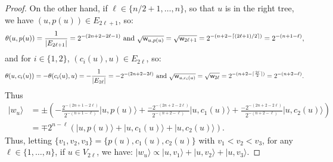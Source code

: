 \documentclass{article}
\def\ket#1{{\lvert}#1\rangle}
\renewcommand{\>}{\rangle}
\newcommand{\<}{\langle}
\renewcommand{\(}{\left(}
\renewcommand{\)}{\right)}
\def\w{{\sf w}}
\begin{document}
\begin{proof}
\noindent On the other hand, if $\ell\in \{n/2+1,\dots, n\}$, so that $u$ is in the right tree, we have $(u,p(u))\in E_{2\ell+1}$, so:
$$\theta(u,p(u)) = \frac{1}{|E_{2\ell+1}|} = 2^{-(2n+2-2\ell-1)}
\mbox{ and }
\sqrt{\w_{u,p(u)}}=\sqrt{\w_{2\ell+1}}=2^{-(n+2-\lceil (2\ell+1)/2\rceil)} = 2^{-(n+1-\ell)},
$$
and for $i\in\{1,2\}$, $(c_i(u),u)\in E_{2\ell}$, so:
$$\theta(u,c_i(u)) = -\theta(c_i(u),u)=-\frac{1}{|E_{2\ell}|} = -2^{-(2n+2-2\ell)}
\mbox{ and }
\sqrt{\w_{u,c_i(u)}}=\sqrt{\w_{2\ell}}=2^{-(n+2-\lceil \frac{2\ell}{2}\rceil)} = 2^{-(n+2-\ell)}.
$$
Thus
\begin{align*}
\ket{w_u} &= \pm\left(-\frac{2^{-(2n+1-2\ell)}}{2^{-(n+1-\ell)}}\ket{u,p(u)}+\frac{-2^{-(2n+2-2\ell)}}{2^{-(n+2-\ell)}}\ket{u,c_1(u)}+\frac{-2^{-(2n+2-2\ell)}}{2^{-(n+2-\ell)}}\ket{u,c_2(u)}\right)\\
&=\mp 2^{n-\ell}\left(\ket{u,p(u)}+\ket{u,c_1(u)}+\ket{u,c_2(u)}\right).
\end{align*}
Thus, letting $\{v_1,v_2,v_3\}=\{p(u),c_1(u),c_2(u)\}$ with $v_1<v_2<v_3$, for any $\ell\in \{1,\dots,n\}$, if $u\in V_{2\ell}$, we have:
$\ket{w_u}\propto \ket{u,v_1}+\ket{u,v_2}+\ket{u,v_3}.$
\end{proof}
\end{document}
